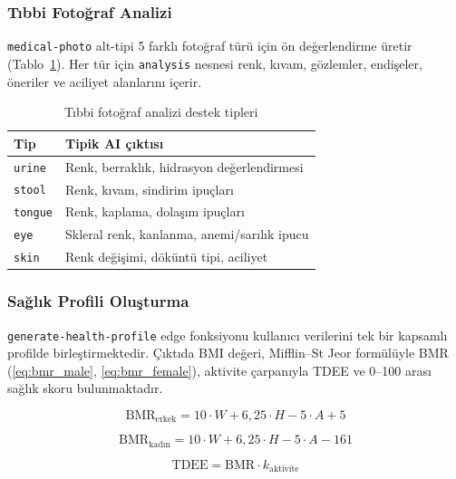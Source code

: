 \subsubsection{Tıbbi Fotoğraf Analizi}

\texttt{medical-photo} alt-tipi 5 farklı fotoğraf türü için ön değerlendirme üretir (Tablo~\ref{tab:medical_photo}). Her tür için \texttt{analysis} nesnesi renk, kıvam, gözlemler, endişeler, öneriler ve aciliyet alanlarını içerir.

\begin{table}[H]
\centering
\caption{Tıbbi fotoğraf analizi destek tipleri}
\label{tab:medical_photo}
\begin{tabular}{|l|l|}
\hline
\textbf{Tip} & \textbf{Tipik AI çıktısı} \\
\hline
\texttt{urine}  & Renk, berraklık, hidrasyon değerlendirmesi \\
\texttt{stool}  & Renk, kıvam, sindirim ipuçları \\
\texttt{tongue} & Renk, kaplama, dolaşım ipuçları \\
\texttt{eye}    & Skleral renk, kanlanma, anemi/sarılık ipucu \\
\texttt{skin}   & Renk değişimi, döküntü tipi, aciliyet \\
\hline
\end{tabular}
\end{table}

\subsubsection{Sağlık Profili Oluşturma}

\texttt{generate-health-profile} edge fonksiyonu kullanıcı verilerini tek bir kapsamlı profilde birleştirmektedir. Çıktıda BMI değeri, Mifflin--St Jeor formülüyle BMR (\eqref{eq:bmr_male}, \eqref{eq:bmr_female}), aktivite çarpanıyla TDEE ve 0--100 arası sağlık skoru bulunmaktadır.

\begin{equation}
\label{eq:bmr_male}
\mathrm{BMR}_{\text{erkek}} = 10 \cdot W + 6{,}25 \cdot H - 5 \cdot A + 5
\end{equation}

\begin{equation}
\label{eq:bmr_female}
\mathrm{BMR}_{\text{kadın}} = 10 \cdot W + 6{,}25 \cdot H - 5 \cdot A - 161
\end{equation}

\begin{equation}
\label{eq:tdee}
\mathrm{TDEE} = \mathrm{BMR} \cdot k_{\text{aktivite}}
\end{equation}

